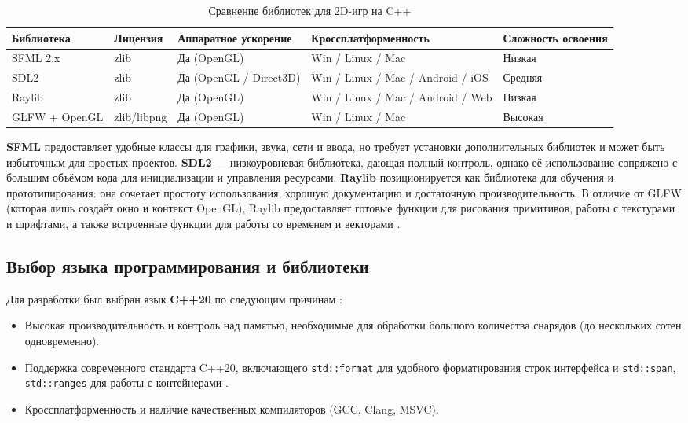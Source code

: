 \documentclass[../main.tex]{subfiles}
\begin{document}
\begin{table}[H]
	\centering
	\caption{Сравнение библиотек для 2D-игр на C++}
	\label{tab:game_engines}
	\begin{tabularx}{\textwidth}{|>{\raggedright\arraybackslash}p{2.2cm}|>{\raggedright\arraybackslash}p{2.2cm}|X|X|>{\raggedright\arraybackslash}p{2.5cm}|}
		\hline
		\textbf{Биб\-ли\-о\-те\-ка} & \textbf{Лицензия} & \textbf{Аппаратное ускорение} & \textbf{Кросс\-плат\-фор\-мен\-ность} & \textbf{Сложность освоения} \\
		\hline
		SFML 2.x & zlib & Да (OpenGL) & Win / Linux / Mac & Низкая \\
		\hline
		SDL2 & zlib & Да (OpenGL / Direct3D) & Win / Linux / Mac / Android / iOS & Средняя \\
		\hline
		Raylib & zlib & Да (OpenGL) & Win / Linux / Mac / Android / Web & Низкая \\
		\hline
		GLFW + OpenGL & zlib/libpng & Да (OpenGL) & Win / Linux / Mac & Высокая \\
		\hline
	\end{tabularx}
\end{table}

\textbf{SFML} предоставляет удобные классы для графики, звука, сети и ввода, но требует установки дополнительных библиотек и может быть избыточным для простых проектов. \textbf{SDL2} — низкоуровневая библиотека, дающая полный контроль, однако её использование сопряжено с большим объёмом кода для инициализации и управления ресурсами. \textbf{Raylib} позиционируется как библиотека для обучения и прототипирования: она сочетает простоту использования, хорошую документацию и достаточную производительность. В отличие от GLFW (которая лишь создаёт окно и контекст OpenGL), Raylib предоставляет готовые функции для рисования примитивов, работы с текстурами и шрифтами, а также встроенные функции для работы со временем и векторами \cite{raylib_docs}.

\subsection{Выбор языка программирования и библиотеки}

Для разработки был выбран язык \textbf{C++20} по следующим причинам \cite{stroustrup2023}:
\begin{itemize}
	\item Высокая производительность и контроль над памятью, необходимые для обработки большого количества снарядов (до нескольких сотен одновременно).
	\item Поддержка современного стандарта C++20, включающего \texttt{std::format} для удобного форматирования строк интерфейса и \texttt{std::span}, \texttt{std::ranges} для работы с контейнерами \cite{cppreference}.
	\item Кроссплатформенность и наличие качественных компиляторов (GCC, Clang, MSVC).
\end{itemize}
\end{document}
